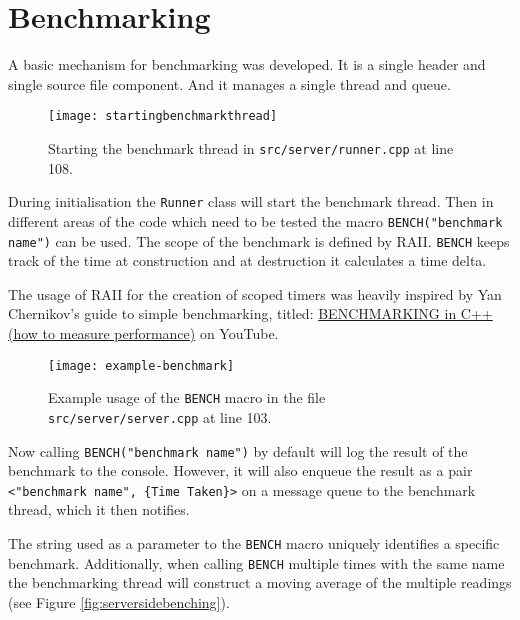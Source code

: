 \documentclass[article]{uom-coursework}
\begin{document}
\section{Benchmarking}

A basic mechanism for benchmarking was developed. It is a single
header and single source file component. And it manages a single
thread and queue.



\begin{figure}[H]
\centering
\texttt{[image: startingbenchmarkthread]}
\caption{Starting the benchmark thread in
\texttt{src/server/runner.cpp} at line 108.}
\label{fig:startingbenchmarkthread}
\end{figure}

During initialisation the \texttt{Runner} class will start the
benchmark thread. Then in different areas of the code which need
to be tested the macro \texttt{BENCH("benchmark name")} can be
used. The scope of the benchmark is defined by RAII.
\texttt{BENCH} keeps track of the time at construction and at
destruction it calculates a time delta.

\begin{attrib}
    The usage of RAII for the creation of scoped timers was
    heavily inspired by Yan Chernikov's guide to simple
    benchmarking, titled:
    \href{https://www.youtube.com/watch?v=YG4jexlSAjc}{BENCHMARKING
    in C++ (how to measure performance)} on YouTube.
\end{attrib}

\begin{figure}[H]
\centering
\texttt{[image: example-benchmark]}
\caption{Example usage of the \texttt{BENCH} macro in the file
\texttt{src/server/server.cpp} at line 103.}
\label{fig:examplebenchmark}
\end{figure}

Now calling \texttt{BENCH("benchmark name")} by default will log
the result of the benchmark to the console. However, it will
also enqueue the result as a pair \texttt{<"benchmark name",
\{Time Taken\}>} on a message queue to the benchmark thread,
which it then notifies.

\begin{note}
    The string used as a parameter to the \texttt{BENCH} macro
    uniquely identifies a specific benchmark. Additionally, when
    calling \texttt{BENCH} multiple times with the same name the
    benchmarking thread will construct a moving average of the
    multiple readings (see Figure \ref{fig:serversidebenching}).
\end{note}
\end{document}
